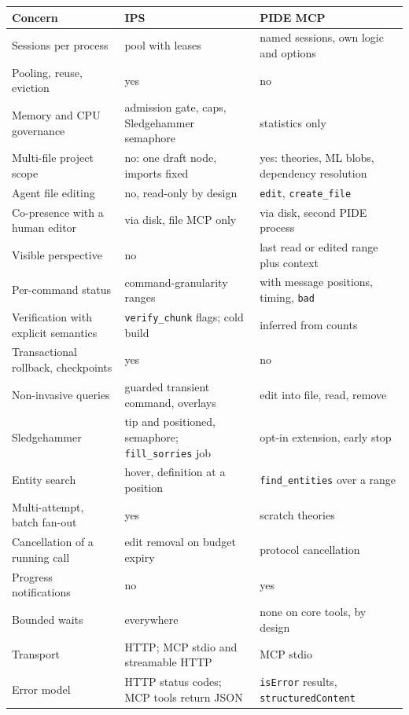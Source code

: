 \documentclass[11pt]{article}
\begin{document}
\begin{table}[p]
\centering\scriptsize
\begin{tabularx}{\textwidth}{@{}>{\raggedright\arraybackslash}p{3.4cm} >{\raggedright\arraybackslash}X >{\raggedright\arraybackslash}X@{}}
\toprule
Concern & IPS & PIDE MCP \\
\midrule
Sessions per process & pool with leases & named sessions, own logic and options \\
Pooling, reuse, eviction & yes & no \\
Memory and CPU governance & admission gate, caps, Sledgehammer semaphore & statistics only \\
Multi-file project scope & no: one draft node, imports fixed & yes: theories, ML blobs, dependency resolution \\
Agent file editing & no, read-only by design & \texttt{edit}, \texttt{create\_file} \\
Co-presence with a human editor & via disk, file MCP only & via disk, second PIDE process \\
Visible perspective & no & last read or edited range plus context \\
Per-command status & command-granularity ranges & with message positions, timing, \texttt{bad} \\
Verification with explicit semantics & \texttt{verify\_chunk} flags; cold build & inferred from counts \\
Transactional rollback, checkpoints & yes & no \\
Non-invasive queries & guarded transient command, overlays & edit into file, read, remove \\
Sledgehammer & tip and positioned, semaphore; \texttt{fill\_sorries} job & opt-in extension, early stop \\
Entity search & hover, definition at a position & \texttt{find\_entities} over a range \\
Multi-attempt, batch fan-out & yes & scratch theories \\
Cancellation of a running call & edit removal on budget expiry & protocol cancellation \\
Progress notifications & no & yes \\
Bounded waits & everywhere & none on core tools, by design \\
Transport & HTTP; MCP stdio and streamable HTTP & MCP stdio \\
Error model & HTTP status codes; MCP tools return JSON & \texttt{isError} results, \texttt{structuredContent} \\

\end{tabularx}
\end{table}
\end{document}

